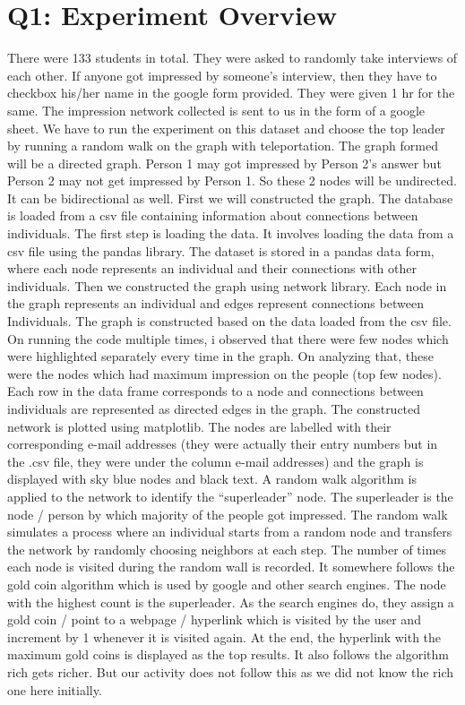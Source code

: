 \documentclass{article}
\begin{document}
\section*{Q1: Experiment Overview}

There were 133 students in total. They were asked to randomly take interviews of each other. If anyone got impressed by someone’s 
interview, then they have to checkbox his/her name in the google form provided. They were given 1 hr for the same.
The impression network collected is sent to us in the form of a google sheet. We have to run the experiment on this dataset and choose 
the top leader by running a random walk on the graph with teleportation. The graph formed will be a directed graph. Person 1 may got 
impressed by Person 2’s answer but Person 2 may not get impressed by Person 1. So these 2 nodes will be undirected. It can be 
bidirectional as well. First we will constructed the graph. The database is loaded from a csv file containing information about 
connections between individuals. The first step is loading the data. It involves loading the data from a csv file using the pandas 
library. The dataset is stored in a pandas data form, where each node represents an individual and their connections with other 
individuals. Then we constructed the graph using network library. Each node in the graph represents an individual and edges represent 
connections between Individuals. The graph is constructed based on the data loaded from the csv file. On running the code multiple times, 
i observed that there were few nodes which were highlighted separately every time in the graph. On analyzing that, these were the nodes 
which had maximum impression on the people (top few nodes). Each row in the data frame corresponds to a node and connections between 
individuals are represented as directed edges in the graph. The constructed network is plotted using matplotlib. The nodes are labelled 
with their corresponding e-mail addresses (they were actually their entry numbers but in the .csv file, they were under the column e-mail 
addresses) and the graph is displayed with sky blue nodes and black text. A random walk algorithm is applied to the network to identify 
the “superleader” node. The superleader is the node / person by which majority of the people got impressed. The random walk simulates a 
process where an individual starts from a random node and transfers the network by randomly choosing neighbors at each step. The number 
of times each node is visited during the random wall is recorded. It somewhere follows the gold coin algorithm which is used by google 
and other search engines. The node with the highest count is the superleader. As the search engines do, they assign a gold coin / point 
to a webpage / hyperlink which is visited by the user and increment by 1 whenever it is visited again. At the end, the hyperlink with the
 maximum gold coins is displayed as the top results. It also follows the algorithm rich gets richer. But our activity does not follow this
  as we did not know the rich one here initially.
\end{document}
